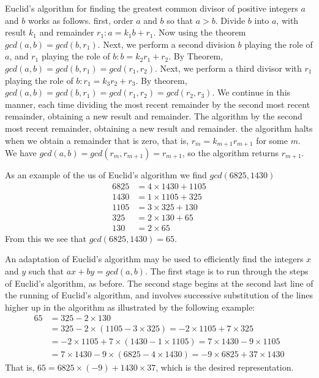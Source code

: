 Euclid's algorithm for finding the greatest common divisor of positive integers $a$ and $b$ works as follows. first, order $a$ and $b$ so that $a>b$. Divide $b$ into $a$, with result $k_1$ and remainder $r_1: a=k_1b+r_1$. Now using the theorem $gcd(a,b)=gcd(b,r_1)$. Next, we perform a second division $b$ playing the role of $a$, and $r_1$ playing the role of $b: b=k_2r_1+r_2$. By Theorem, $gcd(a,b)=gcd(b,r_1)=gcd(r_1,r_2)$. Next, we perform a third divisor with $r_1$ playing the role of $b: r_1 = k_3r_2+r_3$. By theorem, $gcd(a,b)=gcd(b,r_1)=gcd(r_1,r_2)=gcd(r_2,r_3)$. We continue in this manner, each time dividing the most recent remainder by the second most recent remainder, obtaining a new result and remainder. The algorithm by the second most recent remainder, obtaining a new result and remainder. the algorithm halts when we obtain a remainder that is zero, that is, $r_m=k_{m+1}r_{m+1}$ for some $m$. We have $gcd(a,b)=gcd(r_m,r_{m+1})=r_{m+1}$, so the algorithm returns $r_{m+1}$.

As an example of the us of Euclid's algorithm we find $gcd(6825,1430)$
\begin{align*}
    6825&=4\times 1430 + 1105\\
    1430 &=1\times 1105 + 325\\
    1105 &=3 \times 325 + 130\\
    325 &=2 \times 130 + 65\\
    130 &= 2 \times 65
\end{align*}
From this we see that $gcd(6825,1430)=65$.

An adaptation of Euclid's algorithm may be used to efficiently find the integers $x$ and $y$ such that $ax+by=gcd(a,b)$. The first stage is to run through the steps of Euclid's algorithm, as before. The second stage begins at the second last line of the running of Euclid's algorithm, and involves successive substitution of the lines higher up in the algorithm as illustrated by the following example:
\begin{align*}
    65 &=325-2\times 130\\
    &=325 - 2 \times (1105 - 3 \times 325) =-2\times 1105 + 7 \times 325\\
    &= -2 \times 1105 + 7 \times (1430 - 1 \times 1105) =7\times 1430 - 9 \times 1105\\
    &= 7 \times 1430 - 9 \times (6825 - 4 \times 1430) = -9 \times 6825 + 37 \times 1430
\end{align*}
That is, $65 = 6825 \times (-9) + 1430 \times 37$, which is the desired representation.


